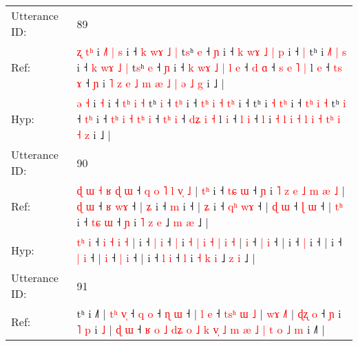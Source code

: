 \documentclass[10pt]{article}
\DeclareRobustCommand{\hl}[1]{{\textcolor{red}{#1}}}
\begin{document}
\begin{longtable}{ll}
 \\
\midrule
Utterance ID: & 89 \\
Ref: & \hl{ʐ} \hl{t}\hl{ʰ} i\hl{ }\hl{˩}\hl{˥}\hl{ }\hl{|} \hl{s} i ˧\hl{ }\hl{k} \hl{w}\hl{ɤ} \hl{˩} \hl{|} t\hl{s}ʰ \hl{e} ˧ \hl{}\hl{ɲ} i ˧ \hl{k}\hl{ }\hl{w}\hl{ɤ} \hl{˩} \hl{|}\hl{ }\hl{p} i ˧\hl{ }\hl{|} tʰ i \hl{˩}\hl{˥} \hl{|}\hl{ }\hl{s} i ˧\hl{ }\hl{k} \hl{w}\hl{ɤ} \hl{˩} \hl{|} t\hl{s}ʰ \hl{e} ˧ \hl{}\hl{ɲ} i ˧ \hl{k}\hl{ }\hl{w}\hl{ɤ} \hl{˩} \hl{|}\hl{ }\hl{l} \hl{e} ˧ \hl{}\hl{d} \hl{ɑ} ˧ \hl{s}\hl{ }\hl{e} \hl{˥} \hl{|} l \hl{e} ˧ \hl{t}\hl{s} \hl{ɤ} ˧ \hl{ɲ} i \hl{˥} \hl{z} \hl{e} \hl{˩} \hl{m} \hl{æ} \hl{˩} \hl{}\hl{|} \hl{ə} \hl{˩} \hl{g} i ˩ |
 \\
Hyp: & \hl{ə} \hl{}\hl{˧} i\hl{}\hl{}\hl{}\hl{}\hl{} \hl{˧} i ˧\hl{}\hl{} \hl{t}\hl{ʰ} \hl{i} \hl{˧} t\hl{}ʰ \hl{i} ˧ \hl{t}\hl{ʰ} i ˧ \hl{t}\hl{ʰ}\hl{ }\hl{i} \hl{˧} \hl{}\hl{t}\hl{ʰ} i ˧\hl{}\hl{} tʰ i \hl{}\hl{˧} \hl{}\hl{t}\hl{ʰ} i ˧\hl{}\hl{} \hl{t}\hl{ʰ} \hl{i} \hl{˧} t\hl{}ʰ \hl{i} ˧ \hl{t}\hl{ʰ} i ˧ \hl{t}\hl{ʰ}\hl{ }\hl{i} \hl{˧} \hl{}\hl{t}\hl{ʰ} \hl{i} ˧ \hl{t}\hl{ʰ} \hl{i} ˧ \hl{}\hl{d}\hl{ʑ} \hl{i} \hl{˧} l \hl{i} ˧ \hl{}\hl{l} \hl{i} ˧ \hl{l} i \hl{˧} \hl{l} \hl{i} \hl{˧} \hl{l} \hl{i} \hl{˧} \hl{t}\hl{ʰ} \hl{i} \hl{˧} \hl{z} i ˩ |
 \\
\midrule
Utterance ID: & 90 \\
Ref: & \hl{ɖ}\hl{ }\hl{ɯ}\hl{ }\hl{˧}\hl{ }\hl{ʁ}\hl{ }\hl{ɖ} \hl{ɯ} ˧\hl{ }\hl{q}\hl{ }\hl{o} \hl{˥} \hl{l} \hl{v}\hl{̩} \hl{˩} |\hl{ }\hl{t}\hl{ʰ} i ˧ \hl{t}\hl{ɕ} \hl{ɯ} ˧ \hl{ɲ} i \hl{˥} \hl{z} \hl{e} \hl{˩} \hl{m} \hl{æ} \hl{˩} |\hl{ }\hl{ɖ} \hl{ɯ} ˧ \hl{ʁ} \hl{w}\hl{ɤ} ˧ |\hl{ }\hl{ʑ} i ˧ \hl{m} i ˧ |\hl{ }\hl{ʑ} i ˧ \hl{q}\hl{ʰ} \hl{w}\hl{ɤ} ˧ |\hl{ }\hl{ɖ} \hl{ɯ} ˧ \hl{ɭ} \hl{ɯ} ˧ |\hl{ }\hl{t}\hl{ʰ} i ˧ \hl{t}\hl{ɕ} \hl{ɯ} ˧ \hl{ɲ} i \hl{˥} \hl{z} \hl{e} ˩ \hl{m} \hl{æ} ˩ |
 \\
Hyp: & \hl{}\hl{}\hl{}\hl{}\hl{}\hl{}\hl{}\hl{t}\hl{ʰ} \hl{i} ˧\hl{}\hl{}\hl{}\hl{} \hl{i} \hl{˧} \hl{}\hl{i} \hl{˧} |\hl{}\hl{}\hl{} i ˧ \hl{}\hl{|} \hl{i} ˧ \hl{|} i \hl{˧} \hl{|} \hl{i} \hl{˧} \hl{|} \hl{i} \hl{˧} |\hl{}\hl{} \hl{i} ˧ \hl{|} \hl{}\hl{i} ˧ |\hl{}\hl{} i ˧ \hl{|} i ˧ |\hl{}\hl{} i ˧ \hl{}\hl{|} \hl{}\hl{i} ˧ |\hl{}\hl{} \hl{i} ˧ \hl{|} \hl{i} ˧ |\hl{}\hl{}\hl{} i ˧ \hl{}\hl{l} \hl{i} ˧ \hl{l} i \hl{˧} \hl{k} \hl{i} ˩ \hl{z} \hl{i} ˩ |
 \\
\midrule
Utterance ID: & 91 \\
Ref: & tʰ i ˩˥ |\hl{ }\hl{t}\hl{ʰ}\hl{ }\hl{v}\hl{̩} ˧\hl{ }\hl{q} \hl{o} ˧\hl{ }\hl{ɳ} \hl{ɯ} ˧ |\hl{ }\hl{l} \hl{e} ˧\hl{ }\hl{t}\hl{s}\hl{ʰ}\hl{ }\hl{ɯ}\hl{ }\hl{˩} | \hl{w}\hl{ɤ} \hl{˩}\hl{˥} |\hl{ }\hl{ɖ}\hl{ʐ} \hl{o} ˧ \hl{ɲ} i \hl{˥} \hl{p} i \hl{˩} |\hl{ }\hl{ɖ} \hl{ɯ} ˧\hl{ }\hl{ʁ}\hl{ }\hl{o} \hl{˩} \hl{d}\hl{ʑ} \hl{o} \hl{˩} \hl{k} \hl{v}\hl{̩} \hl{˩}\hl{ }\hl{m} \hl{æ} \hl{˩} \hl{|}\hl{ }\hl{t} \hl{o} \hl{˩} \hl{m} i ˩\hl{˥} |

\end{longtable}
\end{document}
